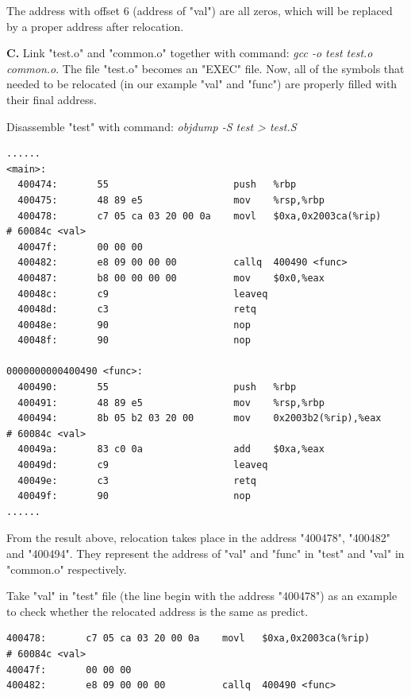     The address with offset 6 (address of "val") are all zeros, which will be replaced by a proper address after relocation.\newline
    
    \textbf{C.} Link "test.o" and "common.o" together with command: \textit{gcc -o test test.o common.o}. The file "test.o" becomes an "EXEC" file. Now, all of the symbols that needed to be relocated (in our example "val" and "func") are properly filled with their final address. 
    
    Disassemble "test" with command: \textit{objdump -S test > test.S}
    \begin{lstlisting}[caption = Disassemble "test" ]
    ......
<main>: 
  400474:       55                      push   %rbp 
  400475:       48 89 e5                mov    %rsp,%rbp 
  400478:       c7 05 ca 03 20 00 0a    movl   $0xa,0x2003ca(%rip)        # 60084c <val> 
  40047f:       00 00 00 
  400482:       e8 09 00 00 00          callq  400490 <func> 
  400487:       b8 00 00 00 00          mov    $0x0,%eax 
  40048c:       c9                      leaveq 
  40048d:       c3                      retq 
  40048e:       90                      nop 
  40048f:       90                      nop 

0000000000400490 <func>: 
  400490:       55                      push   %rbp 
  400491:       48 89 e5                mov    %rsp,%rbp 
  400494:       8b 05 b2 03 20 00       mov    0x2003b2(%rip),%eax        # 60084c <val> 
  40049a:       83 c0 0a                add    $0xa,%eax 
  40049d:       c9                      leaveq 
  40049e:       c3                      retq 
  40049f:       90                      nop 
......
    \end{lstlisting}
    
     From the result above, relocation takes place in the address "400478", "400482" and "400494". They represent the address of "val" and "func" in "test" and "val" in "common.o" respectively. 
     
     Take "val" in "test" file (the line begin with the address "400478") as an example to check whether the relocated address is the same as predict. 
     
     \begin{lstlisting}[caption = Relocation address calculation ]
400478:       c7 05 ca 03 20 00 0a    movl   $0xa,0x2003ca(%rip)        # 60084c <val> 
40047f:       00 00 00 
400482:       e8 09 00 00 00          callq  400490 <func> 
     \end{lstlisting}
     
